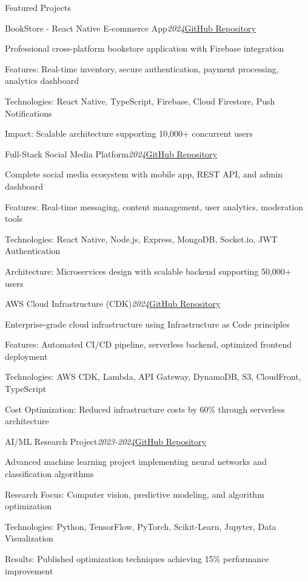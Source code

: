 \documentclass{resume}
\begin{document}
\begin{rSection}{Featured Projects}

\begin{rSubsection}{BookStore - React Native E-commerce App}{\em 2024}{\href{https://github.com/ramezlahzy/BookStore}{GitHub Repository}}{}
\item Professional cross-platform bookstore application with Firebase integration
\item Features: Real-time inventory, secure authentication, payment processing, analytics dashboard
\item Technologies: React Native, TypeScript, Firebase, Cloud Firestore, Push Notifications
\item Impact: Scalable architecture supporting 10,000+ concurrent users
\end{rSubsection}

\begin{rSubsection}{Full-Stack Social Media Platform}{\em 2024}{\href{https://github.com/ramezlahzy/social_app}{GitHub Repository}}{}
\item Complete social media ecosystem with mobile app, REST API, and admin dashboard
\item Features: Real-time messaging, content management, user analytics, moderation tools
\item Technologies: React Native, Node.js, Express, MongoDB, Socket.io, JWT Authentication
\item Architecture: Microservices design with scalable backend supporting 50,000+ users
\end{rSubsection}

\begin{rSubsection}{AWS Cloud Infrastructure (CDK)}{\em 2024}{\href{https://github.com/ramezlahzy/cdk_fullstack_app}{GitHub Repository}}{}
\item Enterprise-grade cloud infrastructure using Infrastructure as Code principles
\item Features: Automated CI/CD pipeline, serverless backend, optimized frontend deployment
\item Technologies: AWS CDK, Lambda, API Gateway, DynamoDB, S3, CloudFront, TypeScript
\item Cost Optimization: Reduced infrastructure costs by 60\% through serverless architecture
\end{rSubsection}

\begin{rSubsection}{AI/ML Research Project}{\em 2023-2024}{\href{https://github.com/ramezlahzy/AI_Bros}{GitHub Repository}}{}
\item Advanced machine learning project implementing neural networks and classification algorithms
\item Research Focus: Computer vision, predictive modeling, and algorithm optimization
\item Technologies: Python, TensorFlow, PyTorch, Scikit-Learn, Jupyter, Data Visualization
\item Results: Published optimization techniques achieving 15\% performance improvement
\end{rSubsection}

\end{rSection}
\end{document}
